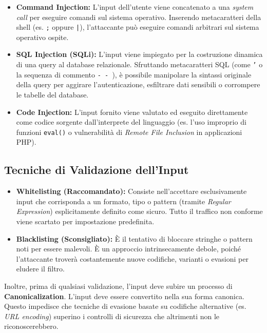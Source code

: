 \begin{itemize}
    \item \textbf{Command Injection:} L'input dell'utente viene concatenato a una \textit{system call} per eseguire comandi sul sistema operativo. Inserendo metacaratteri della shell (es. \texttt{;} oppure \texttt{|}), l'attaccante può eseguire comandi arbitrari sul sistema operativo ospite.
    \item \textbf{SQL Injection (SQLi):} L'input viene impiegato per la costruzione dinamica di una query al database relazionale. Sfruttando metacaratteri SQL (come \texttt{'} o la sequenza di commento \texttt{-{ - }}), è possibile manipolare la sintassi originale della query per aggirare l'autenticazione, esfiltrare dati sensibili o corrompere le tabelle del database.
    \item \textbf{Code Injection:} L'input fornito viene valutato ed eseguito direttamente come codice sorgente dall'interprete del linguaggio (es. l'uso improprio di funzioni \texttt{eval()} o vulnerabilità di \textit{Remote File Inclusion} in applicazioni PHP).
\end{itemize}

\subsection{Tecniche di Validazione dell'Input}
\begin{notebox}
\begin{itemize}
    \item \textbf{Whitelisting (Raccomandato):} Consiste nell'accettare esclusivamente input che corrisponda a un formato, tipo o pattern (tramite \textit{Regular Expression}) esplicitamente definito come sicuro. Tutto il traffico non conforme viene scartato per impostazione predefinita.
    \item \textbf{Blacklisting (Sconsigliato):} È il tentativo di bloccare stringhe o pattern noti per essere malevoli. È un approccio intrinsecamente debole, poiché l'attaccante troverà costantemente nuove codifiche, varianti o evasioni per eludere il filtro.
\end{itemize}
\end{notebox}

Inoltre, prima di qualsiasi validazione, l'input deve subire un processo di \textbf{Canonicalization}. L'input deve essere convertito nella sua forma canonica. Questo impedisce che tecniche di evasione basate su codifiche alternative (es. \textit{URL encoding}) superino i controlli di sicurezza che altrimenti non le riconoscerebbero.

